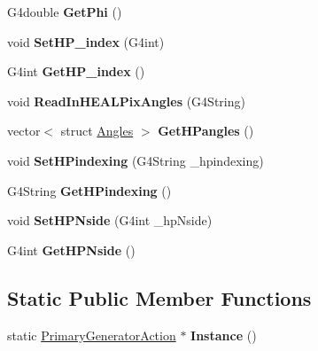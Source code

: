 \begin{DoxyCompactItemize}
G4double {\bfseries Get\+Phi} ()
\item 
\hypertarget{class_primary_generator_action_a99fad0c72d37e52485afd4acff7e7e5d}{}\label{class_primary_generator_action_a99fad0c72d37e52485afd4acff7e7e5d} 
void {\bfseries Set\+H\+P\+\_\+index} (G4int)
\item 
\hypertarget{class_primary_generator_action_af33801f8ff9b0335dd160dafb4b2d7a0}{}\label{class_primary_generator_action_af33801f8ff9b0335dd160dafb4b2d7a0} 
G4int {\bfseries Get\+H\+P\+\_\+index} ()
\item 
\hypertarget{class_primary_generator_action_a67721c44b11abfbcb0405e287a96b825}{}\label{class_primary_generator_action_a67721c44b11abfbcb0405e287a96b825} 
void {\bfseries Read\+In\+H\+E\+A\+L\+Pix\+Angles} (G4\+String)
\item 
\hypertarget{class_primary_generator_action_a28c6b3ac29a1793032f2dcbc5d3a899e}{}\label{class_primary_generator_action_a28c6b3ac29a1793032f2dcbc5d3a899e} 
vector$<$ struct \hyperlink{struct_angles}{Angles} $>$ {\bfseries Get\+H\+Pangles} ()
\item 
\hypertarget{class_primary_generator_action_a0d95e1e27da8ea3a526f9764288909e5}{}\label{class_primary_generator_action_a0d95e1e27da8ea3a526f9764288909e5} 
void {\bfseries Set\+H\+Pindexing} (G4\+String \+\_\+hpindexing)
\item 
\hypertarget{class_primary_generator_action_add419b7d496d524ad7ff22cf912738cf}{}\label{class_primary_generator_action_add419b7d496d524ad7ff22cf912738cf} 
G4\+String {\bfseries Get\+H\+Pindexing} ()
\item 
\hypertarget{class_primary_generator_action_a208b65bf1d407b7a151befa2add93987}{}\label{class_primary_generator_action_a208b65bf1d407b7a151befa2add93987} 
void {\bfseries Set\+H\+P\+Nside} (G4int \+\_\+hp\+Nside)
\item 
\hypertarget{class_primary_generator_action_a08d545a2fc17163e4d4a5ae80c5049a1}{}\label{class_primary_generator_action_a08d545a2fc17163e4d4a5ae80c5049a1} 
G4int {\bfseries Get\+H\+P\+Nside} ()
\end{DoxyCompactItemize}
\subsection*{Static Public Member Functions}
\begin{DoxyCompactItemize}
\item 
\hypertarget{class_primary_generator_action_a04d9a38c08290eb50d0848d44a80b089}{}\label{class_primary_generator_action_a04d9a38c08290eb50d0848d44a80b089} 
static \hyperlink{class_primary_generator_action}{Primary\+Generator\+Action} $\ast$ {\bfseries Instance} ()
\end{DoxyCompactItemize}
